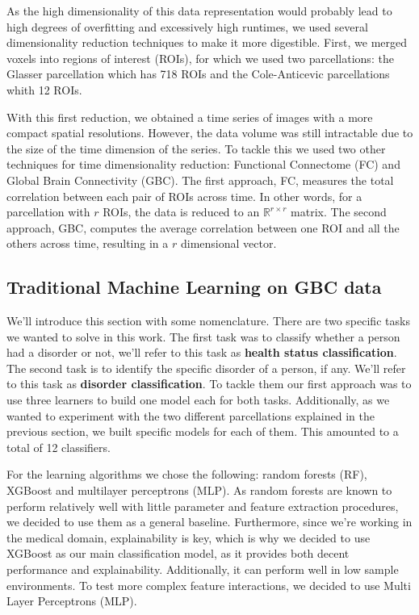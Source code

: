\documentclass[fleqn,moreauthors,10pt]{ds_report}
\begin{document}
As the high dimensionality of this data representation would probably lead to high degrees of overfitting and excessively high runtimes, we used several dimensionality reduction techniques to make it more digestible. First, we merged voxels into regions of interest (ROIs), for which we used two parcellations: the Glasser parcellation which has 718 ROIs and the Cole-Anticevic parcellations whith 12 ROIs.

With this first reduction, we obtained a time series of images with a more compact spatial resolutions. However, the data volume was still intractable due to the size of the time dimension of the series. To tackle this we used two other techniques for time dimensionality reduction: Functional Connectome (FC) and Global Brain Connectivity (GBC). The first approach, FC, measures the total correlation between each pair of ROIs across time. In other words, for a parcellation with $r$ ROIs, the data is reduced to an $\mathbb{R}^{r\times r}$ matrix. The second approach, GBC, computes the average correlation between one ROI and all the others across time, resulting in a $r$ dimensional vector.

\subsection*{Traditional Machine Learning on GBC data}

We'll introduce this section with some nomenclature. There are two specific tasks we wanted to solve in this work. The first task was to classify whether a person had a disorder or not, we'll refer to this task as \textbf{health status classification}. The second task is to identify the specific disorder of a person, if any. We'll refer to this task as \textbf{disorder classification}. To tackle them our first approach was to use three learners to build one model each for both tasks. Additionally, as we wanted to experiment with the two different parcellations explained in the previous section, we built specific models for each of them. This amounted to a total of 12 classifiers. 

For the learning algorithms we chose the following: random forests (RF), XGBoost and multilayer perceptrons (MLP). As random forests are known to perform relatively well with little parameter and feature extraction procedures, we decided to use them as a general baseline. Furthermore, since we're working in the medical domain, explainability is key, which is why we decided to use XGBoost as our main classification model, as it provides both decent performance and explainability. Additionally, it can perform well in low sample environments. To test more complex feature interactions, we decided to use Multi Layer Perceptrons (MLP). 
\end{document}
